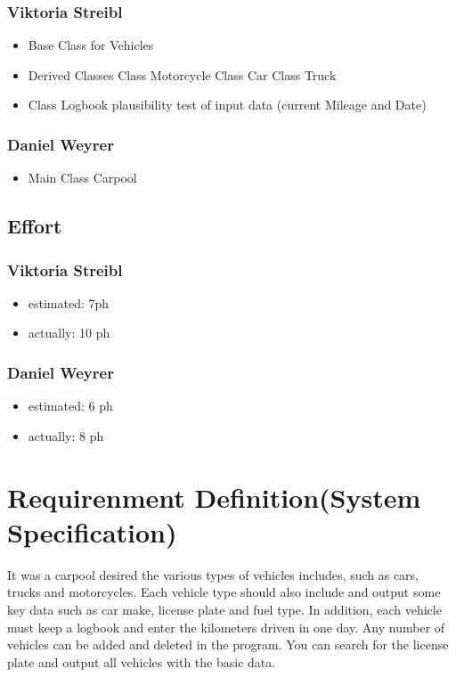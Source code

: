 \subsubsection{Viktoria Streibl}
\begin{itemize}
	\item Base Class for Vehicles
	\item Derived Classes
		\subitem Class Motorcycle
		\subitem Class Car
		\subitem Class Truck
	\item Class Logbook
		\subitem plausibility test of input data (current Mileage and Date)
\end{itemize}

\subsubsection{Daniel Weyrer}
\begin{itemize}
	\item Main Class Carpool
\end{itemize}

\subsection{Effort}

\subsubsection {Viktoria Streibl}
\begin{itemize}
	\item estimated: 7ph 
	\item actually: 10 ph
\end{itemize}

\subsubsection {Daniel Weyrer}
\begin{itemize}
	\item estimated: 6 ph 
	\item actually: 8 ph
\end{itemize}

\section{Requirenment Definition(System Specification)}
It was a carpool desired the various types of vehicles includes, such as cars, trucks and motorcycles. Each vehicle type should also include and output some key data such as car make, license plate and fuel type. In addition, each vehicle must keep a logbook and enter the kilometers driven in one day.
Any number of vehicles can be added and deleted in the program. You can search for the license plate and output all vehicles with the basic data.

